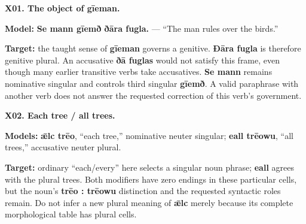 \par\begin{minipage}{\linewidth}\raggedright
\textbf{X01. The object of gīeman.}

\textbf{Model:} \textbf{Se mann gīemð ðāra fugla.} — “The man rules over the birds.”

\textbf{Target:} the taught sense of \textbf{gīeman} governs a genitive. \textbf{Ðāra fugla} is therefore genitive plural. An accusative \textbf{ðā fuglas} would not satisfy this frame, even though many earlier transitive verbs take accusatives. \textbf{Se mann} remains nominative singular and controls third singular \textbf{gīemð}. A valid paraphrase with another verb does not answer the requested correction of this verb’s government.

\end{minipage}\par\addvspace{4pt}

\par\begin{minipage}{\linewidth}\raggedright
\textbf{X02. Each tree /\allowbreak{} all trees.}

\textbf{Models:} \textbf{ǣlc trēo}, “each tree,” nominative neuter singular; \textbf{eall trēowu}, “all trees,” accusative neuter plural.

\textbf{Target:} ordinary “each/\allowbreak{}every” here selects a singular noun phrase; \textbf{eall} agrees with the plural trees. Both modifiers have zero endings in these particular cells, but the noun’s \textbf{trēo : trēowu} distinction and the requested syntactic roles remain. Do not infer a new plural meaning of \textbf{ǣlc} merely because its complete morphological table has plural cells.

\end{minipage}\par\addvspace{4pt}

